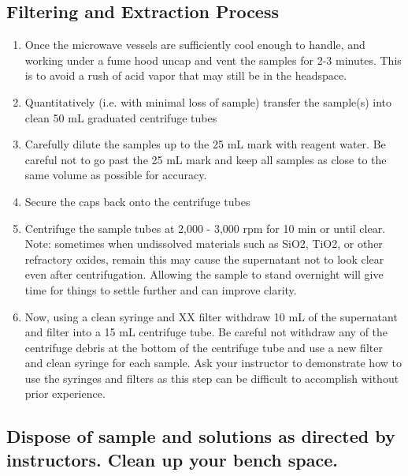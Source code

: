 \documentclass[12pt]{../SOP3_alpha}\usepackage[]{graphicx}\usepackage[]{color}
\begin{document}
\subsection{Filtering and Extraction Process}
  \begin{enumerate}
  \item Once the microwave vessels are sufficiently cool enough to handle, and working under a fume hood uncap and vent the samples for 2-3 minutes. This is to avoid a rush of acid vapor that may still be in the headspace. 
  \item Quantitatively (i.e. with minimal loss of sample) transfer the sample(s) into clean 50 mL graduated centrifuge tubes 
  \item Carefully dilute the samples up to the 25 mL mark with reagent water. Be careful not to go past the 25 mL mark and keep all samples as close to the same volume as possible for accuracy. %
  \item Secure the caps back onto the centrifuge tubes
  \item Centrifuge the sample tubes at 2,000 - 3,000 rpm for 10 min or until clear. \vspace{4mm} \\
  Note: sometimes when undissolved materials such as SiO2, TiO2, or other refractory oxides, remain this may cause the supernatant not to look clear even after centrifugation. Allowing the sample to stand overnight will give time for things to settle further and can improve clarity. 
  \item Now, using a clean syringe and XX filter withdraw 10 mL of the supernatant and filter into a 15 mL centrifuge tube. Be careful not withdraw any of the centrifuge debris at the bottom of the centrifuge tube and use a new filter and clean syringe for each sample.  Ask your instructor to demonstrate how to use the syringes and filters as this step can be difficult to accomplish without prior experience.%
  \end{enumerate}
\subsection { Dispose of sample and solutions as directed by instructors. Clean up your bench space.}
\end{document}
